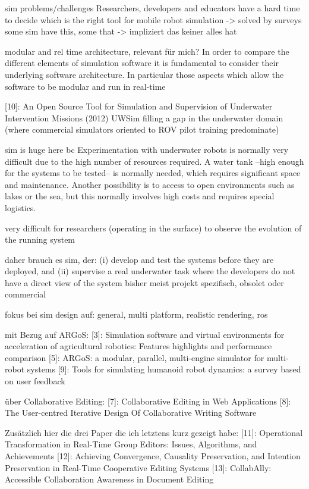 \documentclass[german,version-2020-11]{uzl-thesis}
\begin{document}
    sim problems/challenges
      Researchers, developers and educators have a hard time to decide which is the right tool for mobile robot simulation -> solved by surveys
      some sim have this, some that -> impliziert das keiner alles hat
      
    modular and rel time architecture, relevant für mich?
      In order to compare the different elements of simulation software it is fundamental to consider their underlying software architecture. In particular those aspects which allow the software to be modular and run in real-time
    
[10]: An Open Source Tool for Simulation and Supervision of Underwater Intervention Missions (2012)
      UWSim filling a gap in the underwater domain (where commercial simulators oriented to ROV pilot training predominate)
      
      sim is huge here bc
        Experimentation with underwater robots is normally very difficult due to the high number of resources required.
          A water tank –high enough for the systems to be tested– is normally needed, 
            which requires significant space and maintenance. 
          Another possibility is to access to open environments such as lakes or the sea, but this normally involves high costs and requires special logistics. 
          
          very difficult for researchers (operating in the surface) to observe the evolution of the running system
          
        daher brauch es sim, der:
          (i) develop and test the systems before they are deployed, and 
          (ii) supervise a real underwater task where the developers do not have a direct view of the system
      bisher meist  projekt spezifisch, obsolet oder commercial
      
      fokus bei sim design auf: general, multi platform, realistic rendering, ros
      
mit Bezug auf ARGoS:
[3]: Simulation software and virtual environments for acceleration of agricultural robotics: Features highlights and performance comparison
[5]: ARGoS: a modular, parallel, multi-engine simulator for multi-robot systems
[9]: Tools for simulating humanoid robot dynamics: a survey based on user feedback
      
über Collaborative Editing:
[7]: Collaborative Editing in Web Applications
[8]: The User-centred Iterative Design Of Collaborative Writing Software
      
Zusätzlich hier die drei Paper die ich letztens kurz gezeigt habe:
[11]: Operational Transformation in Real-Time Group Editors: Issues, Algorithms, and Achievements
[12]: Achieving Convergence, Causality Preservation, and Intention Preservation in Real-Time Cooperative Editing Systems
[13]: CollabAlly: Accessible Collaboration Awareness in Document Editing
      
\end{document}
